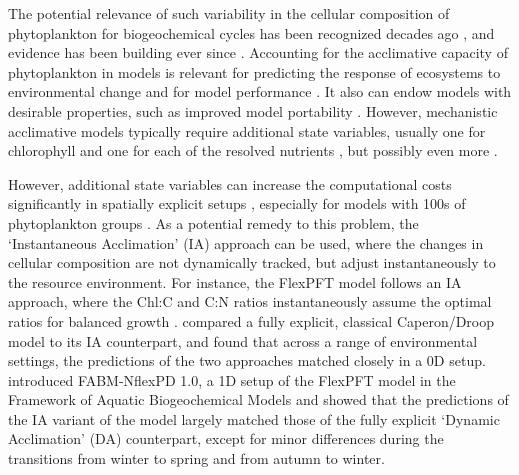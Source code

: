 \documentclass[gmd, manuscript]{copernicus}
\begin{document}
The potential relevance of such variability in the cellular composition of phytoplankton for biogeochemical cycles has been recognized decades ago \citep{Redfield1934,Redfield1958}, and evidence has been building ever since \citep{Lenton2007,Bonachela2016,Pahlow2020}.  Accounting for the acclimative capacity of phytoplankton in models is relevant for predicting the response of ecosystems to environmental change \citep{Kwiatkowski2018,Kerimoglu2018} and for model performance \citep{Ayata2013, Kerimoglu2017, Chen2018a}.  It also can endow models with desirable properties, such as improved model portability \citep{Anugerahanti2021}. However, mechanistic acclimative models typically require additional state variables, usually one for chlorophyll and one for each of the resolved nutrients \citep[e.g.,][]{Geider1998, Flynn2003}, but possibly even more \citep{Bonachela2013, Wirtz2016, Inomura2020}.

However, additional state variables can increase the computational costs significantly in spatially explicit setups \citep{Fulton2003}, especially for models with 100s of phytoplankton groups \citep[e.g.,][]{Follows2007, Dutkiewicz2020}. As a potential remedy to this problem, the `Instantaneous Acclimation' (IA) approach can be used, where the changes in cellular composition are not dynamically tracked, but adjust instantaneously to the resource environment. For instance, the FlexPFT model \citep{Smith2016} follows an IA approach, where the Chl:C and C:N ratios instantaneously assume the optimal ratios for balanced growth \citep{Pahlowetal13}.  \citet{Ward2017} compared a fully explicit, classical Caperon/Droop model \citep{Caperon1968,Droop1968} to its IA counterpart, and found that across a range of environmental settings, the predictions of the two approaches matched closely in a 0D setup.  \citet{Kerimoglu2021} introduced FABM-NflexPD 1.0, a 1D setup of the FlexPFT model in the Framework of Aquatic Biogeochemical Models \citep[FABM,][]{Bruggeman2014} and showed that the predictions of the IA variant of the model largely matched those of the fully explicit `Dynamic Acclimation' (DA) counterpart, except for minor differences during the transitions from winter to spring and from autumn to winter.
\end{document}
